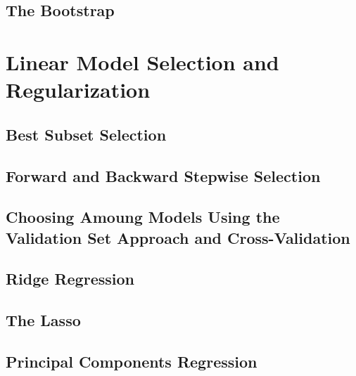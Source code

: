 \documentclass[
]{book}
\begin{document}
\hypertarget{the-bootstrap}{%
\section{The Bootstrap}\label{the-bootstrap}}

\hypertarget{linear-model-selection-and-regularization}{%
\chapter{Linear Model Selection and Regularization}\label{linear-model-selection-and-regularization}}

\hypertarget{best-subset-selection}{%
\section{Best Subset Selection}\label{best-subset-selection}}

\hypertarget{forward-and-backward-stepwise-selection}{%
\section{Forward and Backward Stepwise Selection}\label{forward-and-backward-stepwise-selection}}

\hypertarget{choosing-amoung-models-using-the-validation-set-approach-and-cross-validation}{%
\section{Choosing Amoung Models Using the Validation Set Approach and Cross-Validation}\label{choosing-amoung-models-using-the-validation-set-approach-and-cross-validation}}

\hypertarget{ridge-regression}{%
\section{Ridge Regression}\label{ridge-regression}}

\hypertarget{the-lasso}{%
\section{The Lasso}\label{the-lasso}}

\hypertarget{principal-components-regression}{%
\section{Principal Components Regression}\label{principal-components-regression}}
\end{document}
